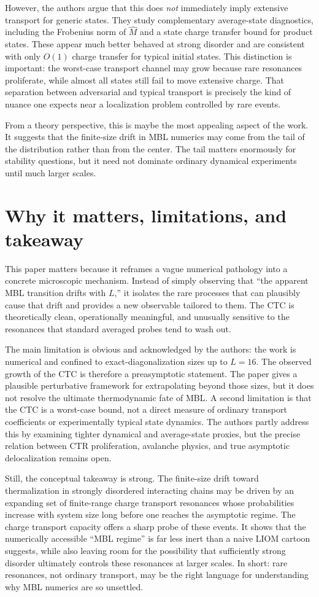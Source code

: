 \documentclass[11pt]{article}
\begin{document}
However, the authors argue that this does \emph{not} immediately imply extensive transport for generic states. They study complementary average-state diagnostics, including the Frobenius norm of $\hat M$ and a state charge transfer bound for product states. These appear much better behaved at strong disorder and are consistent with only $O(1)$ charge transfer for typical initial states. This distinction is important: the worst-case transport channel may grow because rare resonances proliferate, while almost all states still fail to move extensive charge. That separation between adversarial and typical transport is precisely the kind of nuance one expects near a localization problem controlled by rare events.

From a theory perspective, this is maybe the most appealing aspect of the work. It suggests that the finite-size drift in MBL numerics may come from the tail of the distribution rather than from the center. The tail matters enormously for stability questions, but it need not dominate ordinary dynamical experiments until much larger scales.

\section*{Why it matters, limitations, and takeaway}
This paper matters because it reframes a vague numerical pathology into a concrete microscopic mechanism. Instead of simply observing that ``the apparent MBL transition drifts with $L$,'' it isolates the rare processes that can plausibly cause that drift and provides a new observable tailored to them. The CTC is theoretically clean, operationally meaningful, and unusually sensitive to the resonances that standard averaged probes tend to wash out.

The main limitation is obvious and acknowledged by the authors: the work is numerical and confined to exact-diagonalization sizes up to $L=16$. The observed growth of the CTC is therefore a preasymptotic statement. The paper gives a plausible perturbative framework for extrapolating beyond those sizes, but it does not resolve the ultimate thermodynamic fate of MBL. A second limitation is that the CTC is a worst-case bound, not a direct measure of ordinary transport coefficients or experimentally typical state dynamics. The authors partly address this by examining tighter dynamical and average-state proxies, but the precise relation between CTR proliferation, avalanche physics, and true asymptotic delocalization remains open.

Still, the conceptual takeaway is strong. The finite-size drift toward thermalization in strongly disordered interacting chains may be driven by an expanding set of finite-range charge transport resonances whose probabilities increase with system size long before one reaches the asymptotic regime. The charge transport capacity offers a sharp probe of these events. It shows that the numerically accessible ``MBL regime'' is far less inert than a naive LIOM cartoon suggests, while also leaving room for the possibility that sufficiently strong disorder ultimately controls these resonances at larger scales. In short: rare resonances, not ordinary transport, may be the right language for understanding why MBL numerics are so unsettled.
\end{document}
